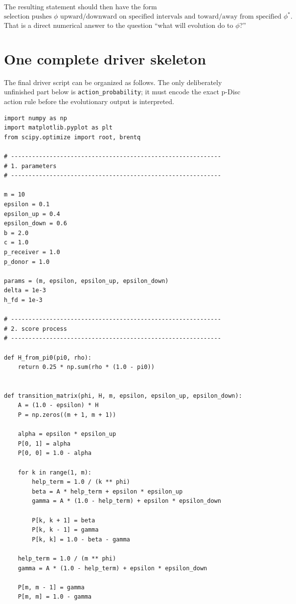 \documentclass[11pt]{article}
\begin{document}
The resulting statement should then have the form
\[
\boxed{
\text{selection pushes }\phi\text{ upward/downward on specified intervals and toward/away from specified }\phi^*.
}
\]
That is a direct numerical answer to the question ``what will evolution do to $\phi$?''

\section{One complete driver skeleton}

The final driver script can be organized as follows. The only deliberately unfinished part below is \texttt{action\_probability}; it must encode the exact p-Disc action rule before the evolutionary output is interpreted.

\begin{lstlisting}
import numpy as np
import matplotlib.pyplot as plt
from scipy.optimize import root, brentq

# ------------------------------------------------------------
# 1. parameters
# ------------------------------------------------------------

m = 10
epsilon = 0.1
epsilon_up = 0.4
epsilon_down = 0.6
b = 2.0
c = 1.0
p_receiver = 1.0
p_donor = 1.0

params = (m, epsilon, epsilon_up, epsilon_down)
delta = 1e-3
h_fd = 1e-3

# ------------------------------------------------------------
# 2. score process
# ------------------------------------------------------------

def H_from_pi0(pi0, rho):
    return 0.25 * np.sum(rho * (1.0 - pi0))


def transition_matrix(phi, H, m, epsilon, epsilon_up, epsilon_down):
    A = (1.0 - epsilon) * H
    P = np.zeros((m + 1, m + 1))

    alpha = epsilon * epsilon_up
    P[0, 1] = alpha
    P[0, 0] = 1.0 - alpha

    for k in range(1, m):
        help_term = 1.0 / (k ** phi)
        beta = A * help_term + epsilon * epsilon_up
        gamma = A * (1.0 - help_term) + epsilon * epsilon_down

        P[k, k + 1] = beta
        P[k, k - 1] = gamma
        P[k, k] = 1.0 - beta - gamma

    help_term = 1.0 / (m ** phi)
    gamma = A * (1.0 - help_term) + epsilon * epsilon_down

    P[m, m - 1] = gamma
    P[m, m] = 1.0 - gamma


\end{lstlisting}
\end{document}

